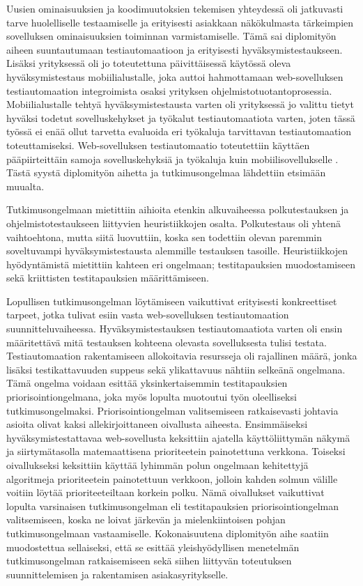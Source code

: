   Uusien ominaisuuksien ja koodimuutoksien tekemisen yhteydessä oli jatkuvasti tarve huolelliselle testaamiselle ja erityisesti asiakkaan näkökulmasta tärkeimpien sovelluksen ominaisuuksien toiminnan varmistamiselle.
  Tämä sai diplomityön aiheen suuntautumaan testiautomaatioon ja erityisesti hyväksymistestaukseen.
  Lisäksi yrityksessä oli jo toteutettuna päivittäisessä käytössä oleva hyväksymistestaus mobiilialustalle, joka auttoi hahmottamaan web-sovelluksen testiautomaation integroimista osaksi yrityksen ohjelmistotuotantoprosessia.
  Mobiilialustalle tehtyä hyväksymistestausta varten oli yrityksessä jo valittu tietyt hyväksi todetut sovelluskehykset ja työkalut testiautomaatiota varten, joten tässä työssä ei enää ollut tarvetta evaluoida eri työkaluja tarvittavan testiautomaation toteuttamiseksi.
  Web-sovelluksen testiautomaatio toteutettiin käyttäen pääpiirteittäin samoja sovelluskehyksiä ja työkaluja kuin mobiilisovellukselle .
  Tästä syystä diplomityön aihetta ja tutkimusongelmaa lähdettiin etsimään muualta.

  Tutkimusongelmaan mietittiin aihioita etenkin alkuvaiheessa polkutestauksen ja ohjelmistotestaukseen liittyvien heuristiikkojen osalta.
  Polkutestaus oli yhtenä vaihtoehtona, mutta siitä luovuttiin, koska sen todettiin olevan paremmin soveltuvampi hyväksymistestausta alemmille testauksen tasoille.
  Heuristiikkojen hyödyntämistä mietittiin kahteen eri ongelmaan; testitapauksien muodostamiseen sekä kriittisten testitapauksien määrittämiseen.

  Lopullisen tutkimusongelman löytämiseen vaikuttivat erityisesti konkreettiset tarpeet, jotka tulivat esiin vasta web-sovelluksen testiautomaation suunnitteluvaiheessa.
  Hyväksymistestauksen testiautomaatiota varten oli ensin määritettävä mitä testauksen kohteena olevasta sovelluksesta tulisi testata.
  Testiautomaation rakentamiseen allokoitavia resursseja oli rajallinen määrä, jonka lisäksi testikattavuuden suppeus sekä ylikattavuus nähtiin selkeänä ongelmana.
  Tämä ongelma voidaan esittää yksinkertaisemmin testitapauksien priorisointiongelmana, joka myös lopulta muotoutui työn oleelliseksi tutkimusongelmaksi.
  Priorisointiongelman valitsemiseen ratkaisevasti johtavia asioita olivat kaksi allekirjoittaneen oivallusta aiheesta.
  Ensimmäiseksi hyväksymistestattavaa web-sovellusta keksittiin ajatella käyttöliittymän näkymä ja siirtymätasolla matemaattisena prioriteetein painotettuna verkkona.
  Toiseksi oivallukseksi keksittiin käyttää lyhimmän polun ongelmaan kehitettyjä algoritmeja prioriteetein painotettuun verkkoon, jolloin kahden solmun välille voitiin löytää prioriteeteiltaan korkein polku.
  Nämä oivallukset vaikuttivat lopulta varsinaisen tutkimusongelman eli testitapauksien priorisointiongelman valitsemiseen, koska ne loivat järkevän ja mielenkiintoisen pohjan tutkimusongelmaan vastaamiselle.
  Kokonaisuutena diplomityön aihe saatiin muodostettua sellaiseksi, että se esittää yleishyödyllisen menetelmän tutkimusongelman ratkaisemiseen sekä siihen liittyvän toteutuksen suunnittelemisen ja rakentamisen asiakasyritykselle.

